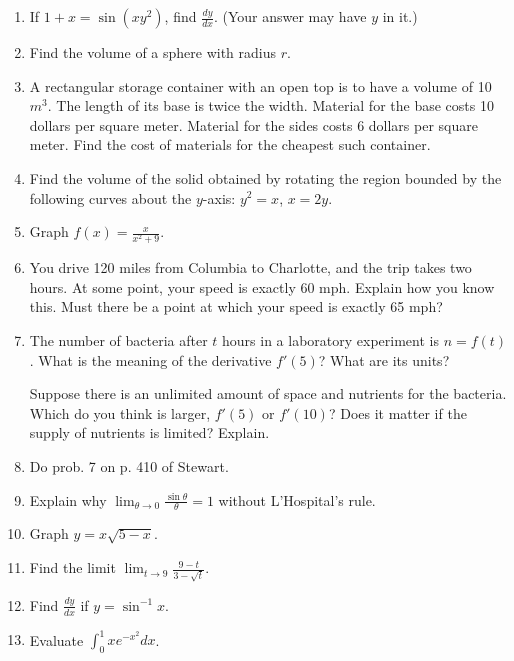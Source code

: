 \documentclass[12pt]{article}
\begin{document}
\begin{enumerate}[(1)]
\item
If $1 + x = \sin(x y^2)$, find $\frac{dy}{dx}$. (Your answer may have $y$ in it.)

\item
Find the volume of a sphere with radius $r$.

\item
A rectangular storage container with an open top is to have a volume of
10 $m^3$. The length of its base is twice the width. Material for the base
costs 10 dollars per square meter. Material for the sides costs 6 dollars per square
meter. Find the cost of materials for the cheapest such container.

\item
Find the volume of the solid obtained by rotating the region bounded by the following
curves about the $y$-axis: $y^2 = x$, $x = 2y$.

\item
Graph $f(x) = \frac{x}{x^2 + 9}$.

\item
You drive 120 miles from Columbia to Charlotte, and the trip takes two hours.
At some point, your speed is exactly 60 mph. Explain how you know this. Must there
be a point at which your speed is exactly 65 mph?

\item
The number of bacteria after $t$ hours in a laboratory experiment is $n = f(t)$.
What is the meaning of the derivative $f'(5)$? What are its units?

Suppose there is an unlimited amount of space and nutrients for the bacteria.
Which do you think is larger, $f'(5)$ or $f'(10)$? Does it matter if the supply of
nutrients is limited? Explain.

\item
Do prob. 7 on p. 410 of Stewart.

\item
Explain why $\lim_{\theta \rightarrow 0} \frac{ \sin \theta}{\theta} = 1$ without
L'Hospital's rule.

\item
Graph $y =  x \sqrt{5 - x}$.
 
\item
Find the limit $\lim_{t \rightarrow 9} \frac{9 - t}{3 - \sqrt{t}}$.

\item
Find $\frac{dy}{dx}$ if $y = \sin^{-1} x$.

\item
Evaluate $\int_0^1 x e^{-x^2} dx$.


\end{enumerate}
\end{document}
